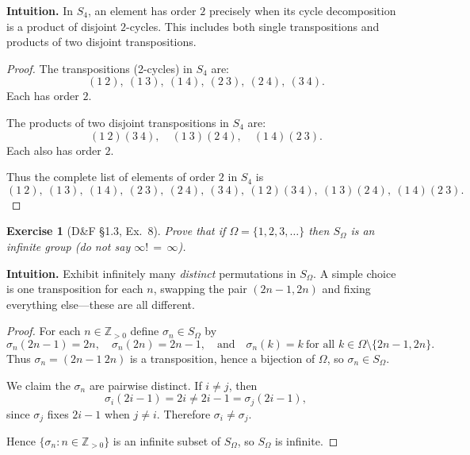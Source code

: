 \documentclass[12pt]{article}
\newtheorem{exercise}[theorem]{Exercise}
\theoremstyle{definition}
\begin{document}
\noindent
\textbf{Intuition.}
In $S_{4}$, an element has order $2$ precisely when its cycle decomposition is a product
of disjoint $2$-cycles. This includes both single transpositions and products of two disjoint
transpositions.

\dotfill

\begin{proof}
The transpositions (2-cycles) in $S_{4}$ are:
\[
(1\ 2),\ (1\ 3),\ (1\ 4),\ (2\ 3),\ (2\ 4),\ (3\ 4).
\]
Each has order $2$.

\dotfill

The products of two disjoint transpositions in $S_{4}$ are:
\[
(1\ 2)(3\ 4),\quad (1\ 3)(2\ 4),\quad (1\ 4)(2\ 3).
\]
Each also has order $2$.

\dotfill

Thus the complete list of elements of order $2$ in $S_{4}$ is
\[
(1\ 2),\ (1\ 3),\ (1\ 4),\ (2\ 3),\ (2\ 4),\ (3\ 4),\ (1\ 2)(3\ 4),\ (1\ 3)(2\ 4),\ (1\ 4)(2\ 3).
\]
\end{proof}

\newpage

\begin{exercise}[D\&F §1.3, Ex.~8]
Prove that if $\Omega=\{1,2,3,\ldots\}$ then $S_{\Omega}$ is an infinite group \emph{(do not say $\infty!\,=\,\infty$)}.
\end{exercise}

\dotfill

\noindent
\textbf{Intuition.}
Exhibit infinitely many \emph{distinct} permutations in $S_{\Omega}$. A simple choice is one transposition for each $n$,
swapping the pair $(2n-1,2n)$ and fixing everything else—these are all different.

\dotfill

\begin{proof}
For each $n\in\mathbb{Z}_{>0}$ define $\sigma_n\in S_{\Omega}$ by
\[
\sigma_n(2n-1)=2n,\quad \sigma_n(2n)=2n-1,\quad \text{and}\quad \sigma_n(k)=k\ \text{for all }k\in\Omega\setminus\{2n-1,2n\}.
\]
Thus $\sigma_n=(2n-1\ 2n)$ is a transposition, hence a bijection of $\Omega$, so $\sigma_n\in S_{\Omega}$.

We claim the $\sigma_n$ are pairwise distinct. If $i\neq j$, then
\[
\sigma_i(2i-1)=2i\neq 2i-1=\sigma_j(2i-1),
\]
since $\sigma_j$ fixes $2i-1$ when $j\neq i$. Therefore $\sigma_i\neq\sigma_j$.

Hence $\{\sigma_n:n\in\mathbb{Z}_{>0}\}$ is an infinite subset of $S_{\Omega}$, so $S_{\Omega}$ is infinite.
\end{proof}
\end{document}
